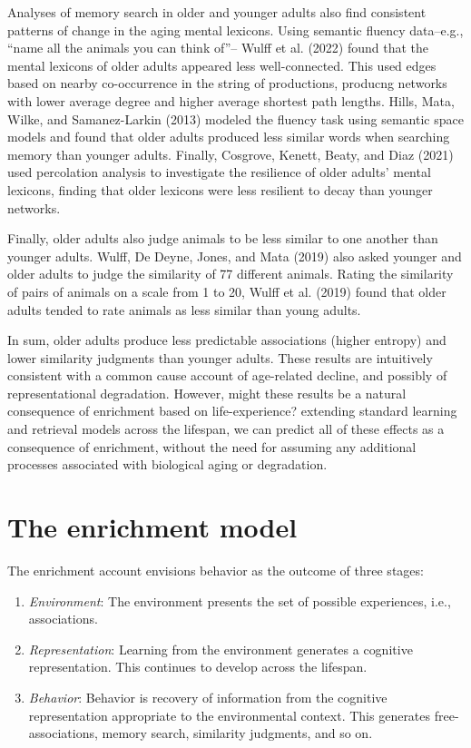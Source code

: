 \documentclass[
  man]{apa6}
\providecommand{\tightlist}{%
  \setlength{\itemsep}{0pt}\setlength{\parskip}{0pt}}
\begin{document}
Analyses of memory search in older and younger adults also find consistent patterns of change in the aging mental lexicons. Using semantic fluency data--e.g., ``name all the animals you can think of''-- Wulff et al. (2022) found that the mental lexicons of older adults appeared less well-connected. This used edges based on nearby co-occurrence in the string of productions, producng networks with lower average degree and higher average shortest path lengths. Hills, Mata, Wilke, and Samanez-Larkin (2013) modeled the fluency task using semantic space models and found that older adults produced less similar words when searching memory than younger adults. Finally, Cosgrove, Kenett, Beaty, and Diaz (2021) used percolation analysis to investigate the resilience of older adults' mental lexicons, finding that older lexicons were less resilient to decay than younger networks.

Finally, older adults also judge animals to be less similar to one another than younger adults. Wulff, De Deyne, Jones, and Mata (2019) also asked younger and older adults to judge the similarity of 77 different animals. Rating the similarity of pairs of animals on a scale from 1 to 20, Wulff et al. (2019) found that older adults tended to rate animals as less similar than young adults.

In sum, older adults produce less predictable associations (higher entropy) and lower similarity judgments than younger adults. These results are intuitively consistent with a common cause account of age-related decline, and possibly of representational degradation. However, might these results be a natural consequence of enrichment based on life-experience? extending standard learning and retrieval models across the lifespan, we can predict all of these effects as a consequence of enrichment, without the need for assuming any additional processes associated with biological aging or degradation.

\hypertarget{the-enrichment-model}{%
\section{The enrichment model}\label{the-enrichment-model}}

The enrichment account envisions behavior as the outcome of three stages:

\begin{enumerate}
\def\labelenumi{\arabic{enumi}.}
\tightlist
\item
  \emph{Environment}: The environment presents the set of possible experiences, i.e., associations.
\item
  \emph{Representation}: Learning from the environment generates a cognitive representation. This continues to develop across the lifespan.
\item
  \emph{Behavior}: Behavior is recovery of information from the cognitive representation appropriate to the environmental context. This generates free-associations, memory search, similarity judgments, and so on.
\end{enumerate}
\end{document}
